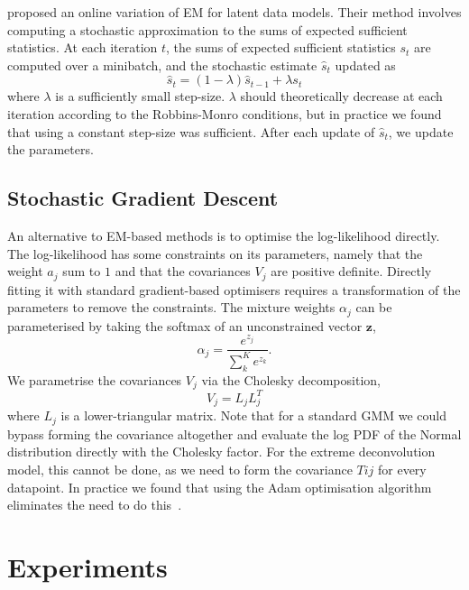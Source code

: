 \documentclass{article}
\begin{document}
\citet{cappeOnlineExpectationMaximization2009} proposed an online variation of EM for latent data models.
Their method involves computing a stochastic approximation to the sums of expected sufficient statistics.
At each iteration $t$, the sums of expected sufficient statistics $s_t$ are computed over a minibatch, and the stochastic estimate $\hat{s}_t$ updated as
\begin{equation}
 \hat{s}_{t} = (1 - \lambda)\hat{s}_{t-1} + \lambda s_t
\end{equation}
where $\lambda$ is a sufficiently small step-size.
$\lambda$ should theoretically decrease at each iteration according to the Robbins-Monro conditions, but in practice we found that using a constant step-size was sufficient.
After each update of $\hat{s}_t$, we update the parameters. 

\subsection{Stochastic Gradient Descent}

An alternative to EM-based methods is to optimise the log-likelihood directly.
The log-likelihood has some constraints on its parameters, namely that the weight $a_j$ sum to $1$ and that the covariances $V_j$ are positive definite.
Directly fitting it with standard gradient-based optimisers requires a transformation of the parameters to remove the constraints.
The mixture weights $\alpha_j$ can be parameterised by taking the softmax of an unconstrained vector $\mathbf{z}$,
\begin{equation}
\alpha_j = \frac{e^{z_j}}{\sum_k^K e^{z_k}}.
\end{equation}
We parametrise the covariances $V_j$ via the Cholesky decomposition, 
\begin{equation}
  V_j = L_jL_j^T
\end{equation}
where $L_j$ is a lower-triangular matrix.
Note that for a standard GMM we could bypass forming the covariance altogether and evaluate the log PDF of the Normal distribution directly with the Cholesky factor.
For the extreme deconvolution model, this cannot be done, as we need to form the covariance $Tij$ for every datapoint.
In practice we found that using the Adam optimisation algorithm eliminates the need to do this~\cite{kingmaAdamMethodStochastic2014}.

\section{Experiments}
\end{document}
